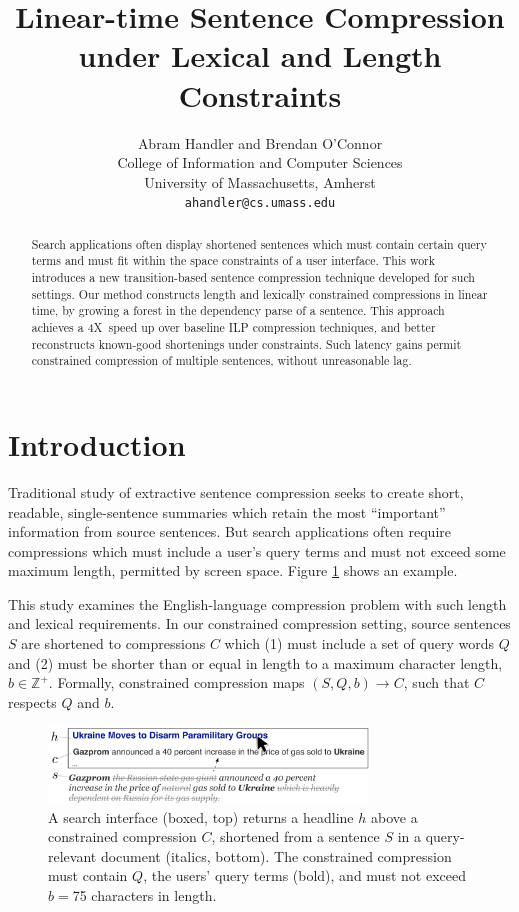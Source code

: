 \documentclass[11pt,a4paper]{article}
\title{Linear-time Sentence Compression under Lexical and Length Constraints}
\author{Abram Handler {\normalfont and} Brendan O'Connor \\
  College of Information and Computer Sciences \\
  University of Massachusetts, Amherst \\
  {\tt ahandler@cs.umass.edu}  \\}
\date{}
\newcommand{\speedup}[0]{4X~}
\begin{document}
\maketitle

\begin{abstract}
Search applications often display shortened sentences which must contain certain query terms and must fit within the space constraints of a user interface. This work introduces a new transition-based sentence compression technique developed for such settings. Our method constructs length and lexically constrained compressions in linear time, by growing a forest in the dependency parse of a sentence. This approach achieves a \speedup speed up over baseline ILP compression techniques, and better reconstructs known-good shortenings under constraints. Such latency gains permit constrained compression of multiple sentences, without unreasonable lag.
\end{abstract}


\section{Introduction}\label{s:intro}

Traditional study of extractive sentence compression seeks to create short, readable, single-sentence summaries which retain the most ``important'' information from source sentences. But search applications often require compressions which must include a user's query terms and must not exceed some maximum length, permitted by screen space.  Figure \ref{f:qf} shows an example.

This study examines the English-language compression problem with such length and lexical requirements. In our constrained compression setting, source sentences $S$ are shortened to compressions $C$ which (1) must include a set of query words $Q$ and (2) must be shorter than or equal in length to a maximum character length, $b \in \mathbb{Z}^{+}$. Formally, constrained compression maps $(S,Q,b) \rightarrow C$, such that $C$ respects $Q$ and $b$.

\begin{figure}[htb!]
\includegraphics[width=8.5cm]{qf.pdf}
\caption{A search interface (boxed, top) returns a headline $h$ above a constrained compression $C$, shortened from a sentence $S$ in a query-relevant document (italics, bottom). The constrained compression must contain $Q$, the users' query terms (bold), and must not exceed $b=$75 characters in length.}
\label{f:qf}
\end{figure}
\end{document}
